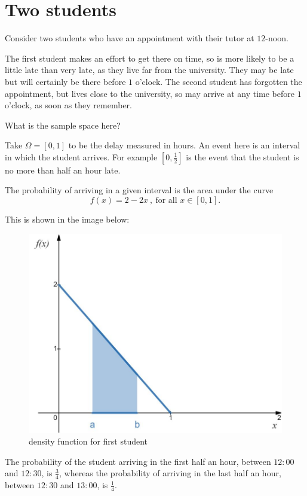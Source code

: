 \documentclass[
]{book}
\theoremstyle{definition}
\theoremstyle{definition}
\theoremstyle{definition}
\theoremstyle{definition}
\theoremstyle{remark}
\begin{document}
\hypertarget{two-students}{%
\section{Two students}\label{two-students}}

Consider two students who have an appointment with their tutor at \(12\)-noon.

The first student makes an effort to get there on time, so is more likely to be a little late than very late, as they live far from the university. They may be late but will certainly be there before \(1\) o'clock.
The second student has forgotten the appointment, but lives close to the university, so may arrive at any time before \(1\) o'clock, as soon as they remember.

What is the sample space here?

Take \(\Omega = [0,1]\) to be the delay measured in hours. An event here is an interval in which the student arrives. For example \([0,\frac{1}{2}]\) is the event that the student is no more than half an hour late.

The probability of arriving in a given interval is the area under the curve \[f(x) = 2-2x \ ,\ \text{for all } x\in[0,1].\]

This is shown in the image below:

\begin{figure}

{\centering \includegraphics[width=0.75\linewidth]{./figures/student1} 

}

\caption{density function for first student}\label{fig:student1}
\end{figure}

The probability of the student arriving in the first half an hour, between \(12:00\) and \(12:30\), is \(\frac{3}{4}\), whereas the probability of arriving in the last half an hour, between \(12:30\) and \(13:00\), is \(\frac{1}{4}\).
\end{document}
